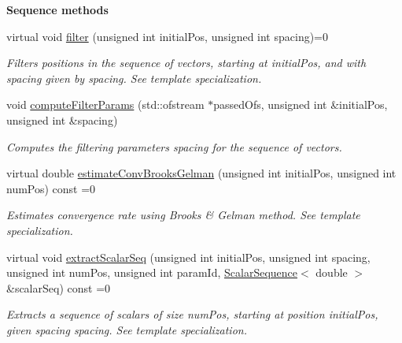 \begin{Indent}{\bf Sequence methods}
\begin{DoxyCompactItemize}
virtual void \hyperlink{class_q_u_e_s_o_1_1_base_vector_sequence_adfb88fdbaa1c6b2b040ef888633619ef}{filter} (unsigned int initial\-Pos, unsigned int spacing)=0
\begin{DoxyCompactList}\small\item\em Filters positions in the sequence of vectors, starting at {\ttfamily initial\-Pos}, and with spacing given by {\ttfamily spacing}. See template specialization. \end{DoxyCompactList}\item 
void \hyperlink{class_q_u_e_s_o_1_1_base_vector_sequence_a8e34f6205e26eab1e9cbe457dbd376bc}{compute\-Filter\-Params} (std\-::ofstream $\ast$passed\-Ofs, unsigned int \&initial\-Pos, unsigned int \&spacing)
\begin{DoxyCompactList}\small\item\em Computes the filtering parameters {\ttfamily spacing} for the sequence of vectors. \end{DoxyCompactList}\item 
virtual double \hyperlink{class_q_u_e_s_o_1_1_base_vector_sequence_a7f70b1762b6ba91a8f619403453cf2b2}{estimate\-Conv\-Brooks\-Gelman} (unsigned int initial\-Pos, unsigned int num\-Pos) const =0
\begin{DoxyCompactList}\small\item\em Estimates convergence rate using Brooks \& Gelman method. See template specialization. \end{DoxyCompactList}\item 
virtual void \hyperlink{class_q_u_e_s_o_1_1_base_vector_sequence_a0ec0f2595d606723d0b069e1632cc348}{extract\-Scalar\-Seq} (unsigned int initial\-Pos, unsigned int spacing, unsigned int num\-Pos, unsigned int param\-Id, \hyperlink{class_q_u_e_s_o_1_1_scalar_sequence}{Scalar\-Sequence}$<$ double $>$ \&scalar\-Seq) const =0
\begin{DoxyCompactList}\small\item\em Extracts a sequence of scalars of size {\ttfamily num\-Pos}, starting at position {\ttfamily initial\-Pos}, given spacing {\ttfamily spacing}. See template specialization. \end{DoxyCompactList}\end{DoxyCompactItemize}
\end{Indent}
